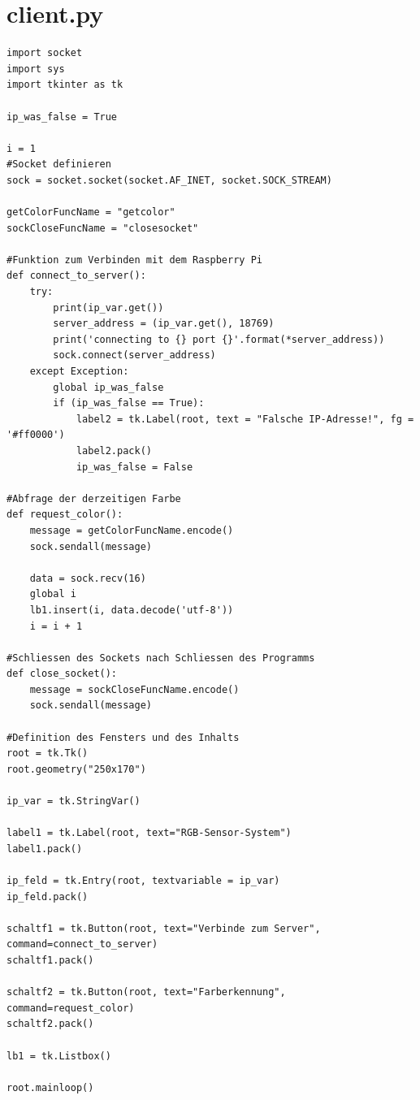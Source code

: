 \documentclass[10pt,a4paper]{report}
\begin{document}
	\section{client.py}
	\begin{lstlisting}
import socket
import sys
import tkinter as tk

ip_was_false = True

i = 1
#Socket definieren
sock = socket.socket(socket.AF_INET, socket.SOCK_STREAM)

getColorFuncName = "getcolor"
sockCloseFuncName = "closesocket"

#Funktion zum Verbinden mit dem Raspberry Pi
def connect_to_server():
    try:
        print(ip_var.get())
        server_address = (ip_var.get(), 18769)
        print('connecting to {} port {}'.format(*server_address))
        sock.connect(server_address)
    except Exception:
        global ip_was_false
        if (ip_was_false == True):
            label2 = tk.Label(root, text = "Falsche IP-Adresse!", fg = '#ff0000')
            label2.pack()
            ip_was_false = False

#Abfrage der derzeitigen Farbe
def request_color():
    message = getColorFuncName.encode()
    sock.sendall(message)

    data = sock.recv(16)
    global i
    lb1.insert(i, data.decode('utf-8'))
    i = i + 1

#Schliessen des Sockets nach Schliessen des Programms
def close_socket():
    message = sockCloseFuncName.encode()
    sock.sendall(message)

#Definition des Fensters und des Inhalts
root = tk.Tk()
root.geometry("250x170")

ip_var = tk.StringVar()

label1 = tk.Label(root, text="RGB-Sensor-System")
label1.pack()

ip_feld = tk.Entry(root, textvariable = ip_var)
ip_feld.pack()

schaltf1 = tk.Button(root, text="Verbinde zum Server", command=connect_to_server)
schaltf1.pack()

schaltf2 = tk.Button(root, text="Farberkennung", command=request_color)
schaltf2.pack()

lb1 = tk.Listbox()

root.mainloop()

		
	\end{lstlisting}
\end{document}
